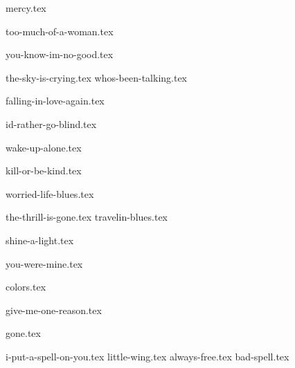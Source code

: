 \begin{songs}{}

  {mercy.tex}
  \sclearpage

  {too-much-of-a-woman.tex}
  \sclearpage

  {you-know-im-no-good.tex}
  \sclearpage

  {the-sky-is-crying.tex}
  {whos-been-talking.tex}

  \sclearpage

  {falling-in-love-again.tex}  
  \sclearpage

  {id-rather-go-blind.tex}  
  \sclearpage
  
  {wake-up-alone.tex}
  \sclearpage
  
  {kill-or-be-kind.tex}
  \sclearpage
  
  {worried-life-blues.tex}
  \sclearpage

  {the-thrill-is-gone.tex}
  {travelin-blues.tex}

  \sclearpage

  {shine-a-light.tex}  
  \sclearpage

  {you-were-mine.tex}
  \sclearpage

  {colors.tex}
  \sclearpage

  {give-me-one-reason.tex}
  \sclearpage

  {gone.tex}
  \sclearpage

  {i-put-a-spell-on-you.tex}
  {little-wing.tex}
  {always-free.tex}
  {bad-spell.tex}
  
 \end{songs}
